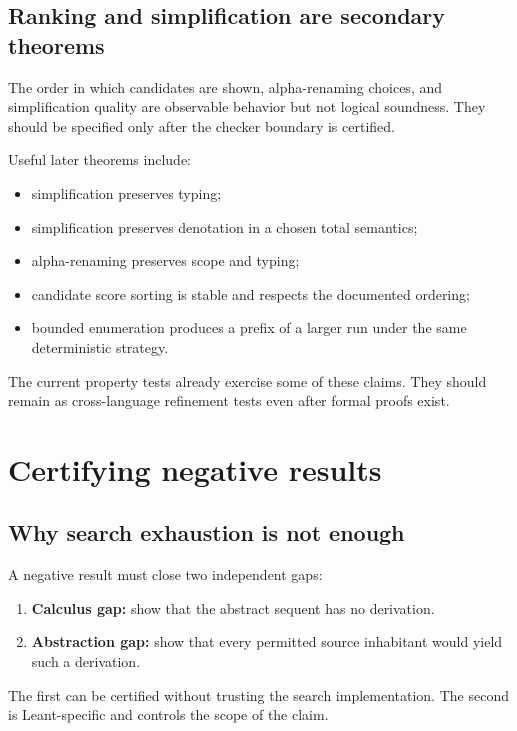 \documentclass[11pt,letterpaper,openany]{report}
\theoremstyle{definition}
\theoremstyle{remark}
\begin{document}
\section{Ranking and simplification are secondary theorems}

The order in which candidates are shown, alpha-renaming choices, and simplification quality are observable behavior but not logical soundness. They should be specified only after the checker boundary is certified.

Useful later theorems include:

\begin{itemize}
\item simplification preserves typing;
\item simplification preserves denotation in a chosen total semantics;
\item alpha-renaming preserves scope and typing;
\item candidate score sorting is stable and respects the documented ordering;
\item bounded enumeration produces a prefix of a larger run under the same deterministic strategy.
\end{itemize}

The current property tests already exercise some of these claims. They should remain as cross-language refinement tests even after formal proofs exist.

\chapter{Certifying negative results}
\label{ch:negative}

\section{Why search exhaustion is not enough}

A negative result must close two independent gaps:

\begin{enumerate}
\item \textbf{Calculus gap:} show that the abstract sequent has no derivation.
\item \textbf{Abstraction gap:} show that every permitted source inhabitant would yield such a derivation.
\end{enumerate}

The first can be certified without trusting the search implementation. The second is Leant-specific and controls the scope of the claim.
\end{document}

